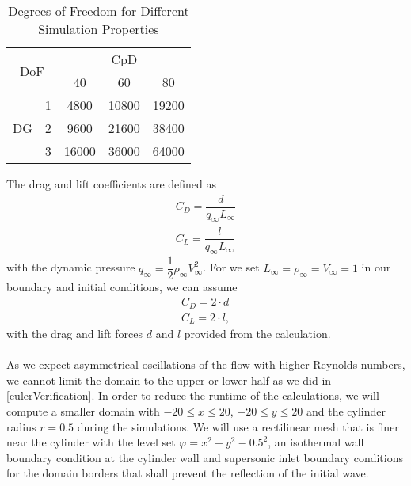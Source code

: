 	\begin{table}[htp]
		\centering
		\def\arraystretch{1.5}
			\begin{tabular}{|c|c|c|c|c|}
				\hline
				\multicolumn{2}{|c|}{\multirow{2}{*}{DoF}} & \multicolumn{3}{c|}{CpD} \\ \cline{3-5} 
				\multicolumn{2}{|c|}{}                       & 40     & 60    & 80    \\ \hline
				\multirow{3}{*}{DG}            & 1           &    4800    &    10800   &    19200    \\ \cline{2-5} 
				& 2           &    9600    &   21600    &    38400    \\ \cline{2-5} 
				& 3           &      16000  &   36000    &   64000     \\ \hline
			\end{tabular}
			\caption{Degrees of Freedom for Different Simulation Properties}	
			\label{DOF}
	\end{table}
	
	 The drag and lift coefficients are defined as
	\begin{align}
		C_D = \dfrac{d}{q_\infty L_\infty} \\
		C_L = \dfrac{l}{q_\infty L_\infty}
	\end{align}
	with the dynamic pressure $q_\infty = \dfrac{1}{2} \rho_\infty V_\infty^2$. For we set $L_\infty = \rho_\infty = V_\infty = 1$ in our boundary and initial conditions, we can assume
	\begin{align}
		C_D = 2 \cdot d \\
		C_L = 2 \cdot l,
	\end{align}
	with the drag and lift forces $d$ and $l$ provided from the calculation. \\\\
	As we expect asymmetrical oscillations of the flow with higher Reynolds numbers, we cannot limit the domain to the upper or lower half as we did in \cref{eulerVerification}. In order to reduce the runtime of the calculations, we will compute a smaller domain with $-20 \leq x \leq 20$, $-20 \leq y \leq 20$ and the cylinder radius $r = 0.5$ during the simulations.
	We will use a rectilinear mesh that is finer near the cylinder with the level set $\varphi = x^2 + y^2 -0.5^2$, an isothermal wall boundary condition at the cylinder wall and supersonic inlet boundary conditions for the domain borders that shall prevent the reflection of the initial wave.  \\\\
		
